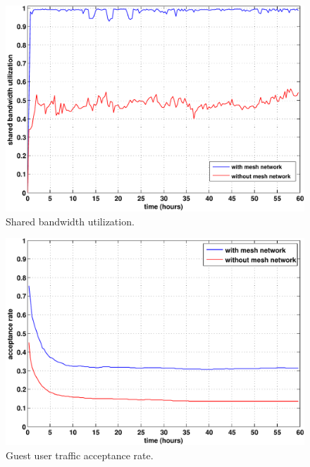 \begin{figure}[t]
\begin{center}
\includegraphics[width=1\linewidth]{results/utilization.pdf}
\caption{Shared bandwidth utilization.}
\label{fig:utilization}
\end{center}
\end{figure}

\begin{figure}[t]
\begin{center}
\includegraphics[width=1\linewidth]{results/acceptance_rate.pdf}
\caption{Guest user traffic acceptance rate.}
\label{fig:acceptance}
\end{center}
\end{figure}

